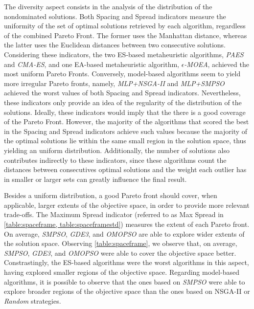 The diversity aspect consists in the analysis of the distribution of the nondominated solutions. Both Spacing and Spread indicators measure the uniformity of the set of optimal solutions retrieved by each algorithm, regardless of the combined Pareto Front. The former uses the Manhattan distance, whereas the latter uses the Euclidean distances between two consecutive solutions. Considering these indicators, the two \ac{ES}-based metaheuristic algorithms, \textit{PAES} and \textit{CMA-ES}, and one \ac{EA}-based metaheuristic algorithm, \textit{$\epsilon$-MOEA}, achieved the most uniform Pareto Fronts. Conversely, model-based algorithms seem to yield more irregular Pareto fronts, namely, \textit{MLP+NSGA-II} and \textit{MLP+SMPSO} achieved the worst values of both Spacing and Spread indicators. Nevertheless, these indicators only provide an idea of the regularity of the distribution of the solutions. Ideally, these indicators would imply that the there is a good coverage of the Pareto Front. However, the majority of the algorithms that scored the best in the Spacing and Spread indicators achieve such values because the majority of the optimal solutions lie within the same small region in the solution space, thus yielding an uniform distribution. Additionally, the number of solutions also contributes indirectly to these indicators, since these algorithms count the distances between consecutives optimal solutions and the weight each outlier has in smaller or larger sets can greatly influence the final result.

Besides a uniform distribution, a good Pareto front should cover, when applicable, larger extents of the objective space, in order to provide more relevant trade-offs. The Maximum Spread indicator (referred to as Max Spread in \cref{table:spaceframe, table:spaceframestd}) measures the extent of each Pareto front. On average, \textit{SMPSO}, \textit{GDE3}, and \textit{OMOPSO} are able to explore wider extents of the solution space. Observing \cref{table:spaceframe}, we observe that, on average, \textit{SMPSO}, \textit{GDE3}, and \textit{OMOPSO} were able to cover the objective space better. Constrastingly, the \ac{ES}-based algorithms were the worst algorithms in this aspect, having explored smaller regions of the objective space. Regarding model-based algorithms, it is possible to observe that the ones based on \textit{SMPSO} were able to explore broader regions of the objective space than the ones based on \ac{NSGA-II} or \textit{Random} strategies. 


